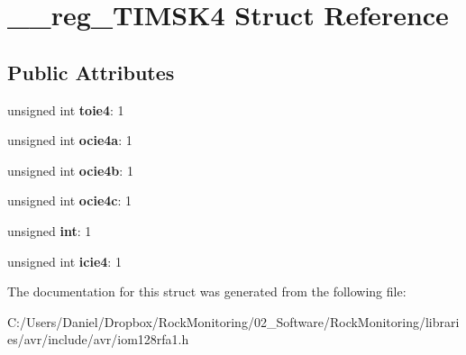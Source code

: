 \hypertarget{struct____reg___t_i_m_s_k4}{}\section{\+\_\+\+\_\+reg\+\_\+\+T\+I\+M\+S\+K4 Struct Reference}
\label{struct____reg___t_i_m_s_k4}
\subsection*{Public Attributes}
\begin{DoxyCompactItemize}
\item 
unsigned int {\bfseries toie4}\+: 1\hypertarget{struct____reg___t_i_m_s_k4_a8f30978d5f301c9a3fa53e766380e888}{}\label{struct____reg___t_i_m_s_k4_a8f30978d5f301c9a3fa53e766380e888}

\item 
unsigned int {\bfseries ocie4a}\+: 1\hypertarget{struct____reg___t_i_m_s_k4_a42e2750e9fa973e4fbeda22be997de32}{}\label{struct____reg___t_i_m_s_k4_a42e2750e9fa973e4fbeda22be997de32}

\item 
unsigned int {\bfseries ocie4b}\+: 1\hypertarget{struct____reg___t_i_m_s_k4_ae928464b19493de529fce18acf9667a3}{}\label{struct____reg___t_i_m_s_k4_ae928464b19493de529fce18acf9667a3}

\item 
unsigned int {\bfseries ocie4c}\+: 1\hypertarget{struct____reg___t_i_m_s_k4_a939b12866f8508ba219a56ecc69e1837}{}\label{struct____reg___t_i_m_s_k4_a939b12866f8508ba219a56ecc69e1837}

\item 
unsigned {\bfseries int}\+: 1\hypertarget{struct____reg___t_i_m_s_k4_a63ecf00d2d1376bf3f477c7fb6a4df30}{}\label{struct____reg___t_i_m_s_k4_a63ecf00d2d1376bf3f477c7fb6a4df30}

\item 
unsigned int {\bfseries icie4}\+: 1\hypertarget{struct____reg___t_i_m_s_k4_ab88a695fea747c2971dd6698ab6b0d49}{}\label{struct____reg___t_i_m_s_k4_ab88a695fea747c2971dd6698ab6b0d49}

\end{DoxyCompactItemize}


The documentation for this struct was generated from the following file\+:\begin{DoxyCompactItemize}
\item 
C\+:/\+Users/\+Daniel/\+Dropbox/\+Rock\+Monitoring/02\+\_\+\+Software/\+Rock\+Monitoring/libraries/avr/include/avr/iom128rfa1.\+h\end{DoxyCompactItemize}
